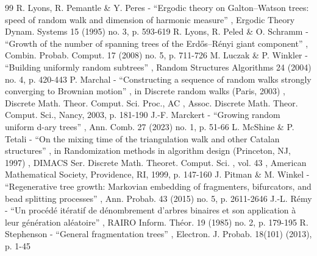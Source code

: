 \begin{thebibliography}{99}
 R. Lyons, R. Pemantle \& Y. Peres - “Ergodic theory on Galton–Watson trees: speed of random walk and dimension of harmonic measure” , Ergodic Theory Dynam. Systems 15 (1995) no. 3, p. 593-619
 R. Lyons, R. Peled \& O. Schramm - “Growth of the number of spanning trees of the Erdős–Rényi giant component” , Combin. Probab. Comput. 17 (2008) no. 5, p. 711-726
 M. Luczak \& P. Winkler - “Building uniformly random subtrees” , Random Structures Algorithms 24 (2004) no. 4, p. 420-443
 P. Marchal - “Constructing a sequence of random walks strongly converging to Brownian motion” , in Discrete random walks (Paris, 2003) , Discrete Math. Theor. Comput. Sci. Proc., AC , Assoc. Discrete Math. Theor. Comput. Sci., Nancy, 2003, p. 181-190
 J.-F. Marckert - “Growing random uniform d-ary trees” , Ann. Comb. 27 (2023) no. 1, p. 51-66
 L. McShine \& P. Tetali - “On the mixing time of the triangulation walk and other Catalan structures” , in Randomization methods in algorithm design (Princeton, NJ, 1997) , DIMACS Ser. Discrete Math. Theoret. Comput. Sci. , vol. 43 , American Mathematical Society, Providence, RI, 1999, p. 147-160
 J. Pitman \& M. Winkel - “Regenerative tree growth: Markovian embedding of fragmenters, bifurcators, and bead splitting processes” , Ann. Probab. 43 (2015) no. 5, p. 2611-2646
 J.-L. Rémy - “Un procédé itératif de dénombrement d’arbres binaires et son application à leur génération aléatoire” , RAIRO Inform. Théor. 19 (1985) no. 2, p. 179-195
 R. Stephenson - “General fragmentation trees” , Electron. J. Probab. 18(101) (2013), p. 1-45
\end{thebibliography}
